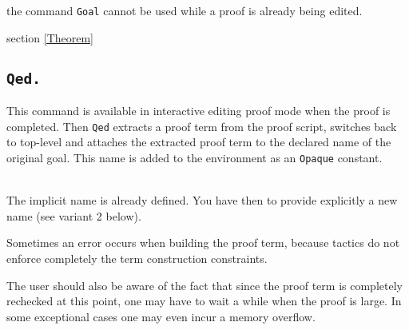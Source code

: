 \begin{ErrMsgs}
\item {}
\item {}
the command {\tt Goal} cannot be used while a proof is already being edited.
\end{ErrMsgs}

\SeeAlso section \ref{Theorem}

\subsection{\tt Qed.}\label{Qed}
This command is available in interactive editing proof mode when the
proof is completed.  Then {\tt Qed} extracts a proof term from the
proof script, switches back to {\Coq} top-level and attaches the
extracted proof term to the declared name of the original goal. This
name is added to the environment as an {\tt Opaque} constant.

\begin{ErrMsgs}
\item {}
\item \ident\ \\ 
  The implicit name is already defined. You have then to provide
  explicitly a new name (see variant 2 below).
\item Sometimes an error occurs when building the proof term,
because tactics do not enforce completely the term construction
constraints.

The user should also be aware of the fact that since the proof term is
completely rechecked at this point, one may have to wait a while when
the proof is large. In some exceptional cases one may even incur a
memory overflow.
\end{ErrMsgs}

